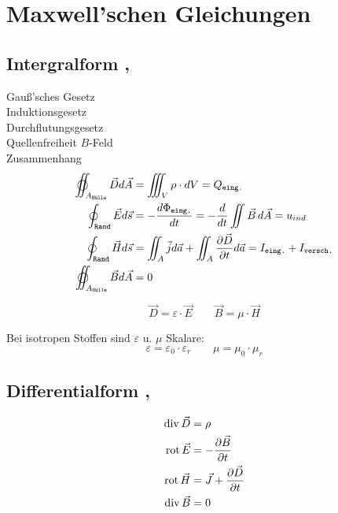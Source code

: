 \section{Maxwell’schen Gleichungen}

\subsection{Intergralform , }
Gauß'sches Gesetz\\
Induktionsgesetz\\
Durchflutungsgesetz\\
Quellenfreiheit $B$-Feld\\
Zusammenhang
\begin{align*}
    \varoiint_{A_\texttt{Hülle}} \vec{D} d \vec{A} & = \iiint_{V} \rho \cdot dV = Q_\texttt{eing.}                                                                                    \\
    \oint_\texttt{Rand} \vec{E} d \vec{s}          & = -\dfrac{d\Phi_\texttt{eing.}}{dt} = -\frac{d}{dt} \iint \vec{B} \, d\vec{A} = u_{ind}                                          \\
    \oint_\texttt{Rand} \vec{H} d \vec{s}          & = \iint_{A} \vec{j} d \vec{a} + \iint_{A}\frac{ \partial \vec{D}}{ \partial t} d \vec{a} = I_\texttt{eing.} + I_\texttt{versch.} \\
    \varoiint_{A_\texttt{Hülle}} \vec{B} d \vec{A} & = 0
\end{align*}

\[
    \vec{D} = \varepsilon \cdot \vec{E} \qquad
    \vec{B} = \mu \cdot \vec{H}
\]

Bei isotropen Stoffen sind $\varepsilon$ u. $\mu$ Skalare:
\[
    \varepsilon = \varepsilon_0 \cdot \varepsilon_r \qquad \mu = \mu_0 \cdot \mu_r
\]

\subsection{Differentialform , }
\begin{align*}
    \operatorname{div} \vec{D}             & = \rho                                           \\
    \operatorname{rot} \vec{E} & = -\dfrac{\partial \vec{B}}{\partial t}          \\
    \operatorname{rot} \vec{H} & = \vec{J} + \dfrac{\partial \vec{D}}{\partial t} \\
    \operatorname{div} \vec{B}             & = 0
\end{align*}

